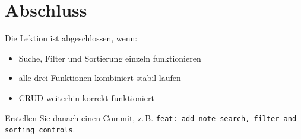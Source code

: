 \documentclass[a4paper,12pt]{article}
\begin{document}
\section{Abschluss}

Die Lektion ist abgeschlossen, wenn:
\begin{itemize}
    \item Suche, Filter und Sortierung einzeln funktionieren
    \item alle drei Funktionen kombiniert stabil laufen
    \item CRUD weiterhin korrekt funktioniert
\end{itemize}

Erstellen Sie danach einen Commit, z.\,B.
\texttt{feat: add note search, filter and sorting controls}.
\end{document}
